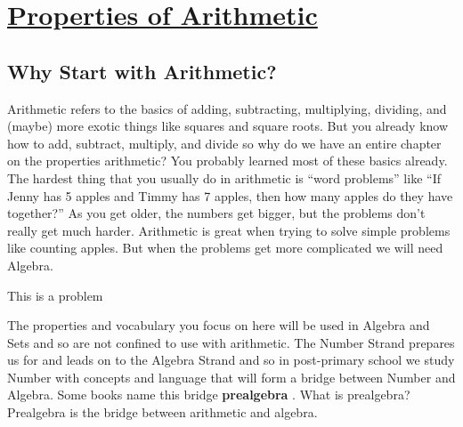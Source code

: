 
\chapter{\protect\hyperlink{chap:\thechapter}{Properties of Arithmetic}}



\section{Why Start with Arithmetic?}
Arithmetic refers to the basics of adding, subtracting, multiplying, dividing, and (maybe) more exotic things like squares and square roots.
But you already know how to add, subtract, multiply, and divide  so why do we have an entire chapter on the properties arithmetic?  You probably learned most of these basics already. The hardest thing that you usually do in arithmetic is “word problems” like “If Jenny has 5 apples and Timmy has 7 apples, then how many apples do they have together?” As you get older, the numbers get bigger, but the problems don’t really get much harder. Arithmetic is great when trying to solve simple problems like counting apples. But when the problems get more complicated we will need Algebra.


\begin{problem}
This is a problem
\end{problem}


\begin{connection}
The properties and vocabulary you focus on here will be used in Algebra and Sets and so are not confined to use with arithmetic. The Number Strand prepares us for and leads on to the Algebra Strand and so in post-primary school we study Number with concepts and language that will form a bridge between Number and Algebra. Some books name this bridge \textbf{prealgebra} . What is prealgebra?  Prealgebra is the bridge between arithmetic and algebra.
\end{connection}






 



